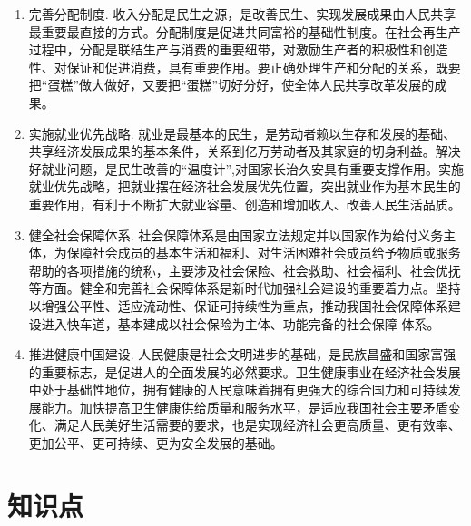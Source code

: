 \documentclass[12pt, a4paper, oneside]{ctexbook}
\begin{document}
\begin{enumerate}
\item 完善分配制度.
收入分配是民生之源，是改善民生、实现发展成果由人民共享最重要最直接的方式。分配制度是促进共同富裕的基础性制度。在社会再生产过程中，分配是联结生产与消费的重要纽带，对激励生产者的积极性和创造性、对保证和促进消费，具有重要作用。要正确处理生产和分配的关系，既要把“蛋糕”做大做好，又要把“蛋糕”切好分好，使全体人民共享改革发展的成果。

\item 实施就业优先战略.
就业是最基本的民生，是劳动者赖以生存和发展的基础、共享经济发展成果的基本条件，关系到亿万劳动者及其家庭的切身利益。解决好就业问题，是民生改善的“温度计”,对国家长治久安具有重要支撑作用。实施就业优先战略，把就业摆在经济社会发展优先位置，突出就业作为基本民生的重要作用，有利于不断扩大就业容量、创造和增加收入、改善人民生活品质。

\item 健全社会保障体系.
社会保障体系是由国家立法规定并以国家作为给付义务主体，为保障社会成员的基本生活和福利、对生活困难社会成员给予物质或服务帮助的各项措施的统称，主要涉及社会保险、社会救助、社会福利、社会优抚等方面。健全和完善社会保障体系是新时代加强社会建设的重要着力点。坚持以增强公平性、适应流动性、保证可持续性为重点，推动我国社会保障体系建设进入快车道，基本建成以社会保险为主体、功能完备的社会保障
体系。

\item 推进健康中国建设.
人民健康是社会文明进步的基础，是民族昌盛和国家富强的重要标志，是促进人的全面发展的必然要求。卫生健康事业在经济社会发展中处于基础性地位，拥有健康的人民意味着拥有更强大的综合国力和可持续发展能力。加快提高卫生健康供给质量和服务水平，是适应我国社会主要矛盾变化、满足人民美好生活需要的要求，也是实现经济社会更高质量、更有效率、更加公平、更可持续、更为安全发展的基础。
\end{enumerate}


\section{知识点}
\end{document}
